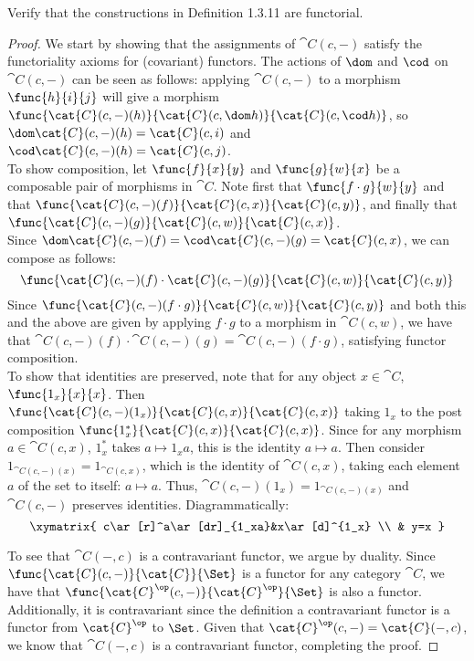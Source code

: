 \documentclass[main.tex]{subfiles}
\begin{document}
\begin{exercise}
	Verify that the constructions in Definition 1.3.11 are functorial.
\end{exercise}

\begin{proof}
	We start by showing that the assignments of $\cat{C}(c,-)$ satisfy the
	functoriality axioms for (covariant) functors. The actions of $\dom$ and
	$\cod$ on $\cat{C}(c,-)$ can be seen as follows: applying $\cat{C}(c,-)$ to
	a morphism $\func{h}{i}{j}$ will give a morphism
	$\func{\cat{C}(c,-)(h)}{\cat{C}(c,\dom h)}{ \cat{C}(c,\cod h)}$, so
	$\dom\cat{C}(c,-)(h) = \cat{C}(c,i)$ and $\cod\cat{C}(c,-)(h) =
	\cat{C}(c,j)$. \\

	To show composition, let $\func{f}{x}{y}$ and $\func{g}{w}{x}$ be a
	composable pair of morphisms in $\cat{C}$. Note first that $\func{f\cdot
	g}{w}{y}$ and that $\func{\cat{C}(c,-)(f)}{\cat{C}(c,x)}{\cat{C}(c,y)}$, and
	finally that $\func{\cat{C}(c,-)(g)}{\cat{C}(c,w)}{\cat{C}(c,x)}$. \\ Since
	$\dom\cat{C}(c,-)(f) = \cod\cat{C}(c,-)(g) = \cat{C}(c,x)$, we can compose
	as follows: \[\func{\cat{C}(c,-)(f)\cdot
	\cat{C}(c,-)(g)}{\cat{C}(c,w)}{\cat{C}(c,y)}\] Since
	$\func{\cat{C}(c,-)(f\cdot g)}{\cat{C}(c,w)}{\cat{C}(c,y)}$ and both this
	and the above are given by applying $f\cdot g$ to a morphism in
	$\cat{C}(c,w)$, we have that $\cat{C}(c,-)(f)\cdot \cat{C}(c,-)(g) =
	\cat{C}(c,-)(f\cdot g)$, satisfying functor composition.\\

	To show that identities are preserved, note that for any object
	$x\in\cat{C}$, $\func{1_x}{x}{x}$. Then
	$\func{\cat{C}(c,-)(1_x)}{\cat{C}(c,x)}{\cat{C}(c,x)}$ taking $1_x$ to the
	post composition $\func{1^{*}_{x}}{\cat{C}(c,x)}{\cat{C}(c,x)}$. Since for
	any morphism $a\in\cat{C}(c,x)$, $1^{*}_x$ takes $a\mapsto 1_xa$, this is
	the identity $a\mapsto a$. Then consider $1_{\cat{C}(c,-)(x)} =
	1_{\cat{C}(c,x)}$, which is the identity of $\cat{C}(c,x)$, taking each
	element $a$ of the set to itself: $a\mapsto a$. Thus, $\cat{C}(c,-)(1_x) =
	1_{\cat{C}(c,-)(x)}$ and $\cat{C}(c,-)$ preserves identities.
	Diagrammatically:\\
	\[\xymatrix{
		c\ar[r]^a\ar[dr]_{1_xa}&x\ar[d]^{1_x} \\
		& y=x
	}
	\]

	To see that $\cat{C}(-,c)$ is a contravariant functor, we argue by duality.
	Since $\func{\cat{C}(c,-)}{\cat{C}}{\Set}$ is a functor for any category
	$\cat{C}$, we have that $\func{\cat{C}^\op(c,-)}{\cat{C}^\op}{\Set}$ is also
	a functor. Additionally, it is contravariant since the definition a
	contravariant functor is a functor from $\cat{C}^\op$ to $\Set$. Given that
	$\cat{C}^\op(c,-) = \cat{C}(-,c)$, we know that $\cat{C}(-,c)$ is a
	contravariant functor, completing the proof.
\end{proof}
\end{document}
